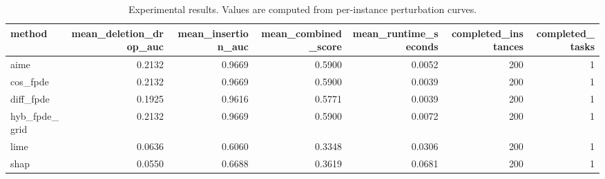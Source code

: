 \begin{table}[t]
\caption{Experimental results. Values are computed from per-instance perturbation curves.}
\label{tab:main_results_computed}
\centering
\begin{tabular}{lrrrrrr}
\toprule
method & mean\_deletion\_drop\_auc & mean\_insertion\_auc & mean\_combined\_score & mean\_runtime\_seconds & completed\_instances & completed\_tasks \\
\midrule
aime & 0.2132 & 0.9669 & 0.5900 & 0.0052 & 200 & 1 \\
cos\_fpde & 0.2132 & 0.9669 & 0.5900 & 0.0039 & 200 & 1 \\
diff\_fpde & 0.1925 & 0.9616 & 0.5771 & 0.0039 & 200 & 1 \\
hyb\_fpde\_grid & 0.2132 & 0.9669 & 0.5900 & 0.0072 & 200 & 1 \\
lime & 0.0636 & 0.6060 & 0.3348 & 0.0306 & 200 & 1 \\
shap & 0.0550 & 0.6688 & 0.3619 & 0.0681 & 200 & 1 \\
\bottomrule
\end{tabular}

\end{table}
